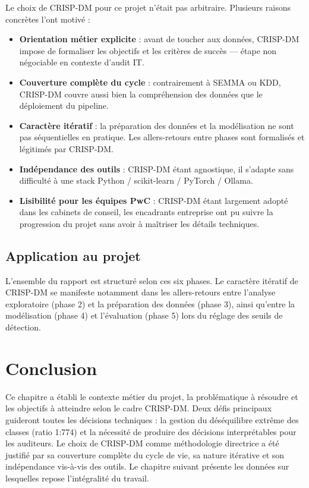 Le choix de CRISP-DM pour ce projet n'était pas arbitraire. Plusieurs raisons concrètes
l'ont motivé :

\begin{itemize}
  \item \textbf{Orientation métier explicite} : avant de toucher aux données, CRISP-DM
    impose de formaliser les objectifs et les critères de succès --- étape non négociable
    en contexte d'audit IT.
  \item \textbf{Couverture complète du cycle} : contrairement à SEMMA ou KDD, CRISP-DM
    couvre aussi bien la compréhension des données que le déploiement du pipeline.
  \item \textbf{Caractère itératif} : la préparation des données et la modélisation ne
    sont pas séquentielles en pratique. Les allers-retours entre phases sont formalisés
    et légitimés par CRISP-DM.
  \item \textbf{Indépendance des outils} : CRISP-DM étant agnostique, il s'adapte sans
    difficulté à une stack Python / scikit-learn / PyTorch / Ollama.
  \item \textbf{Lisibilité pour les équipes PwC} : CRISP-DM étant largement adopté dans
    les cabinets de conseil, les encadrants entreprise ont pu suivre la progression du
    projet sans avoir à maîtriser les détails techniques.
\end{itemize}

\subsection{Application au projet}

L'ensemble du rapport est structuré selon ces six phases. Le caractère itératif de
CRISP-DM se manifeste notamment dans les allers-retours entre l'analyse exploratoire
(phase 2) et la préparation des données (phase 3), ainsi qu'entre la modélisation
(phase 4) et l'évaluation (phase 5) lors du réglage des seuils de détection.

\section*{Conclusion}

Ce chapitre a établi le contexte métier du projet, la problématique à résoudre et les
objectifs à atteindre selon le cadre CRISP-DM. Deux défis principaux guideront toutes
les décisions techniques : la gestion du déséquilibre extrême des classes (ratio 1:774)
et la nécessité de produire des décisions interprétables pour les auditeurs. Le choix
de CRISP-DM comme méthodologie directrice a été justifié par sa couverture complète du
cycle de vie, sa nature itérative et son indépendance vis-à-vis des outils. Le chapitre
suivant présente les données sur lesquelles repose l'intégralité du travail.
